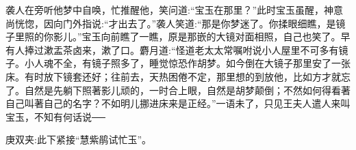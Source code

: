 \begin{parag}
    袭人在旁听他梦中自唤，忙推醒他，笑问道:“宝玉在那里？”此时宝玉虽醒，神意尚恍惚，因向门外指说:“才出去了。”袭人笑道:“那是你梦迷了。你揉眼细瞧，是镜子里照的你影儿。”宝玉向前瞧了一瞧，原是那嵌的大镜对面相照，自己也笑了。早有人捧过漱盂茶卤来，漱了口。麝月道:“怪道老太太常嘱咐说小人屋里不可多有镜子。小人魂不全，有镜子照多了，睡觉惊恐作胡梦。如今倒在大镜子那里安了一张床。有时放下镜套还好；往前去，天热困倦不定，那里想的到放他，比如方才就忘了。自然是先躺下照著影儿顽的，一时合上眼，自然是胡梦颠倒；不然如何得看著自己叫著自己的名字？不如明儿挪进床来是正经。”一语未了，只见王夫人遣人来叫宝玉，不知有何话说──\begin{note}庚双夹:此下紧接“慧紫鹃试忙玉”。\end{note}
\end{parag}

